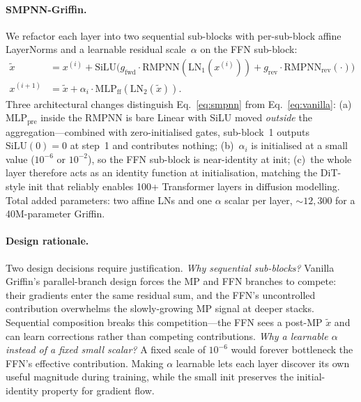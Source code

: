 \documentclass{article}
\begin{document}
\paragraph{SMPNN-Griffin.}
We refactor each layer into two sequential sub-blocks with per-sub-block affine LayerNorms and a learnable residual scale~$\alpha$ on the FFN sub-block:
\begin{align}
  \tilde{x}    &= x^{(i)} + \mathrm{SiLU}\big(g_{\text{fwd}}\!\cdot\!\mathrm{RMPNN}(\mathrm{LN}_1(x^{(i)})) + g_{\text{rev}}\!\cdot\!\mathrm{RMPNN}_{\text{rev}}(\cdot)\big) \\
  x^{(i+1)}    &= \tilde{x} + \alpha_i \cdot \mathrm{MLP}_{\text{ff}}(\mathrm{LN}_2(\tilde{x})).                                                                     \label{eq:smpnn}
\end{align}
Three architectural changes distinguish Eq.~\eqref{eq:smpnn} from Eq.~\eqref{eq:vanilla}: (a)~$\mathrm{MLP}_{\text{pre}}$ inside the RMPNN is bare Linear with SiLU moved \emph{outside} the aggregation---combined with zero-initialised gates, sub-block~1 outputs $\mathrm{SiLU}(0)\!=\!0$ at step~1 and contributes nothing; (b)~$\alpha_i$ is initialised at a small value ($10^{-6}$ or $10^{-2}$), so the FFN sub-block is near-identity at init; (c)~the whole layer therefore acts as an identity function at initialisation, matching the DiT-style init that reliably enables 100+ Transformer layers in diffusion modelling. Total added parameters: two affine LNs and one $\alpha$ scalar per layer, ${\sim}12{,}300$ for a 40M-parameter Griffin.

\paragraph{Design rationale.}
Two design decisions require justification. \emph{Why sequential sub-blocks?} Vanilla Griffin's parallel-branch design forces the MP and FFN branches to compete: their gradients enter the same residual sum, and the FFN's uncontrolled contribution overwhelms the slowly-growing MP signal at deeper stacks. Sequential composition breaks this competition---the FFN sees a post-MP $\tilde{x}$ and can learn corrections rather than competing contributions. \emph{Why a learnable $\alpha$ instead of a fixed small scalar?} A fixed scale of $10^{-6}$ would forever bottleneck the FFN's effective contribution. Making $\alpha$ learnable lets each layer discover its own useful magnitude during training, while the small init preserves the initial-identity property for gradient flow.
\end{document}
